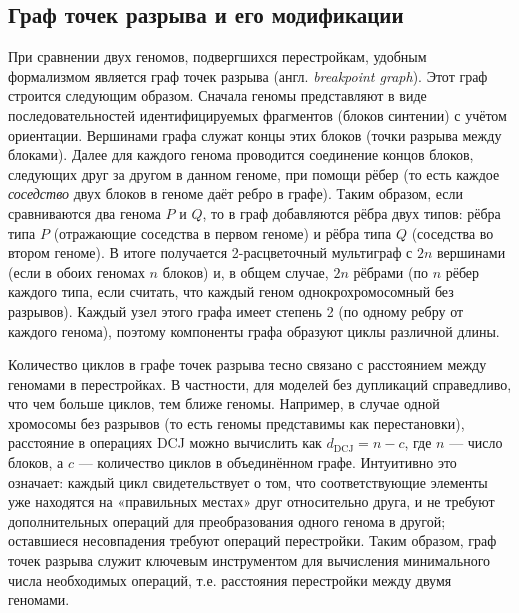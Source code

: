 \subsection{Граф точек разрыва и его модификации}
\label{subsec:breakpoint_graph}

При сравнении двух геномов, подвергшихся перестройкам, удобным формализмом является граф точек разрыва (англ. \textit{breakpoint graph}).
Этот граф строится следующим образом.
Сначала геномы представляют в виде последовательностей идентифицируемых фрагментов (блоков синтении) с учётом ориентации.
Вершинами графа служат концы этих блоков (точки разрыва между блоками).
Далее для каждого генома проводится соединение концов блоков, следующих друг за другом в данном геноме, при помощи рёбер (то есть каждое \textit{соседство} двух блоков в геноме даёт ребро в графе).
Таким образом, если сравниваются два генома $P$ и $Q$, то в граф добавляются рёбра двух типов: рёбра типа $P$ (отражающие соседства в первом геноме) и рёбра типа $Q$ (соседства во втором геноме).
В итоге получается 2-расцветочный мультиграф с $2n$ вершинами (если в обоих геномах $n$ блоков) и, в общем случае, $2n$ рёбрами (по $n$ рёбер каждого типа, если считать, что каждый геном однокрохромосомный без разрывов).
Каждый узел этого графа имеет степень 2 (по одному ребру от каждого генома), поэтому компоненты графа образуют циклы различной длины. 

Количество циклов в графе точек разрыва тесно связано с расстоянием между геномами в перестройках.
В частности, для моделей без дупликаций справедливо, что чем больше циклов, тем ближе геномы.
Например, в случае одной хромосомы без разрывов (то есть геномы представимы как перестановки), расстояние в операциях DCJ можно вычислить как $d_{\text{DCJ}} = n - c$, где $n$ — число блоков, а $c$ — количество циклов в объединённом графе.
Интуитивно это означает: каждый цикл свидетельствует о том, что соответствующие элементы уже находятся на «правильных местах» друг относительно друга, и не требуют дополнительных операций для преобразования одного генома в другой; оставшиеся несовпадения требуют операций перестройки.
Таким образом, граф точек разрыва служит ключевым инструментом для вычисления минимального числа необходимых операций, т.е. расстояния перестройки между двумя геномами.

